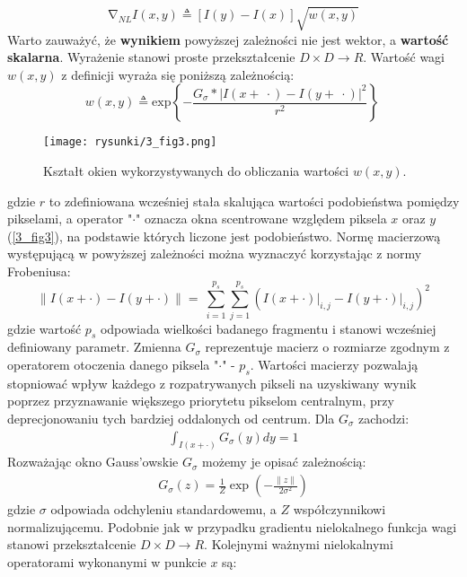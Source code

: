 \documentclass[12pt, twoside, openany]{report}
\theoremstyle{definition}
\begin{document}
\begin{equation}
{\mathrm{\nabla }}_{NL}I\left(x,y\right)\triangleq \left[I\left(y\right)-I\left(x\right)\right]\sqrt{w(x,y)}
\label{NLGRAD}
\end{equation}
Warto zauważyć, że \textbf{wynikiem} powyższej zależności nie jest wektor, a \textbf{wartość skalarna}. Wyrażenie stanowi proste przekształcenie $D \times D\longrightarrow R$. Wartość wagi $w(x,y)$ z definicji wyraża się poniższą zależnością:
\begin{equation}
w\left(x,y\right)\triangleq {\mathrm{exp} \left\{-\frac{G_{\sigma }*{\left|I\left(x+\ \cdot \right)-I\left(y+\ \cdot \right)\right|}^2}{r^2}\right\}\ }
\label{NLWEIGHT}
\end{equation}
\begin{figure}[!h]
	\centering
	\texttt{[image: rysunki/3\_fig3.png]}
	\caption{Kształt okien wykorzystywanych do obliczania wartości $w(x,y)$.}
	\label{3_fig3}
\end{figure}
gdzie $r$ to zdefiniowana wcześniej stała skalująca wartości podobieństwa pomiędzy pikselami, a operator "$\cdot$" oznacza okna scentrowane względem piksela $x$ oraz $y$ (\autoref{3_fig3}), na podstawie których liczone jest podobieństwo. Normę macierzową występującą w powyższej zależności można wyznaczyć korzystając z normy Frobeniusa:
\begin{equation}
{\|I\left(x+\cdot \right)-I\left(y+\cdot \right)\|}=\ \sum^{p_s}_{i=1}{\sum^{p_s}_{j=1}{{\left(I(x+\cdot)\big|_{i,j}-I(y+\cdot)\big|_{i,j}\right)}^2}}
\label{FROBENIUS}
\end{equation}
gdzie wartość $p_s$ odpowiada wielkości badanego fragmentu i stanowi wcześniej definiowany parametr. Zmienna $G_\sigma$ reprezentuje macierz o rozmiarze zgodnym z operatorem otoczenia danego piksela "$\cdot$" - $p_s$. Wartości macierzy pozwalają stopniować wpływ każdego z rozpatrywanych pikseli na uzyskiwany wynik poprzez przyznawanie większego priorytetu pikselom centralnym, przy deprecjonowaniu tych bardziej oddalonych od centrum. Dla $G_\sigma$ zachodzi:
\begin{align}
\int_{I(x+\cdot)}G_{\sigma}(y)dy = 1
\end{align}
Rozważając okno Gauss'owskie $G_\sigma$ możemy je opisać zależnością:
\begin{align}
G_\sigma(z)=\frac{1}{Z}\exp(-\frac{\|z\|}{2\sigma^2})
\label{oknoGaussowskie}
\end{align}
gdzie $\sigma$ odpowiada odchyleniu standardowemu, a $Z$ współczynnikowi normalizującemu. Podobnie jak w przypadku gradientu nielokalnego funkcja wagi stanowi przekształcenie $D \times D\longrightarrow R$. Kolejnymi ważnymi nielokalnymi operatorami wykonanymi w punkcie $x$ są: 
\end{document}
